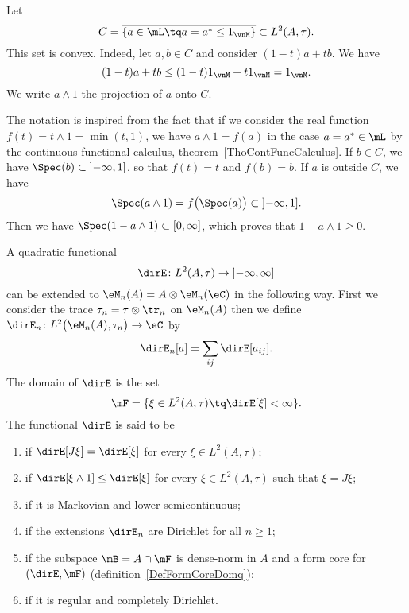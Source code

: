 Let
\begin{equation}
	C=\overline{ \{ a\in\mL\tq a=a^*\leq 1_{\vnM} \} }\subset L^2(A,\tau).
\end{equation}
This set is convex. Indeed, let $a,b\in C$ and consider $(1-t)a+tb$. We have
\begin{equation}
	(1-t)a+tb\leq(1-t)1_{\vnM}+t 1_{\vnM}=1_{\vnM}.
\end{equation}
We write $a\wedge 1$ the projection of $a$ onto $C$.

The notation is inspired from the fact that if we consider the real function $f(t)=t\wedge 1=\min(t,1)$, we have $a\wedge 1=f(a)$ in the case $a=a^*\in\mL$ by the continuous functional calculus, theorem~\ref{ThoContFuncCalculus}. If $b\in C$, we have $\Spec(b)\subset\mathopen] -\infty , 1 \mathclose]$, so that $f(t)=t$ and $f(b)=b$. If $a$ is outside $C$, we have
\begin{equation}
	\Spec(a\wedge 1)=f\big( \Spec(a) \big)\subset\mathopen] -\infty , 1 \mathclose].
\end{equation}
Then we have $\Spec(1-a\wedge 1)\subset\mathopen[ 0 , \infty \mathclose]$, which proves that $1-a\wedge 1\geq 0$.

A quadratic functional
\begin{equation}
	\dirE\colon L^2(A,\tau)\to \mathopen] -\infty , \infty \mathclose]
\end{equation}
can be extended to $\eM_n(A)=A\otimes\eM_n(\eC)$ in the following way. First we consider the trace $\tau_n=\tau\otimes\tr_n$ on $\eM_n(A)$ then we define $\dirE_n\colon L^2\big( \eM_n(A),\tau_n \big)\to \eC$ by
\begin{equation}
	\dirE_n[a]=\sum_{ij}\dirE[a_{ij}].
\end{equation}
The domain of $\dirE$ is the set
\begin{equation}
	\mF=\{ \xi\in L^2(A,\tau)\tq \dirE[\xi]<\infty \}.
\end{equation}
The functional $\dirE$ is said to be
\begin{enumerate}
	\item
		 if $\dirE[J\xi]=\dirE[\xi]$ for every $\xi\in L^2(A,\tau)$;
	\item
		 if $\dirE[\xi\wedge 1]\leq\dirE[\xi]$ for every $\xi\in L^2(A,\tau)$ such that $\xi=J\xi$;
	\item
		 if it is Markovian and lower semicontinuous;
	\item
		 if the extensions $\dirE_n$ are Dirichlet for all $n\geq 1$;
	\item
		 if the subspace $\mB=A\cap\mF$ is dense-norm in $A$ and a form core for $(\dirE,\mF)$ (definition~\ref{DefFormCoreDomq});
	\item
		 if it is regular and completely Dirichlet.
\end{enumerate}


